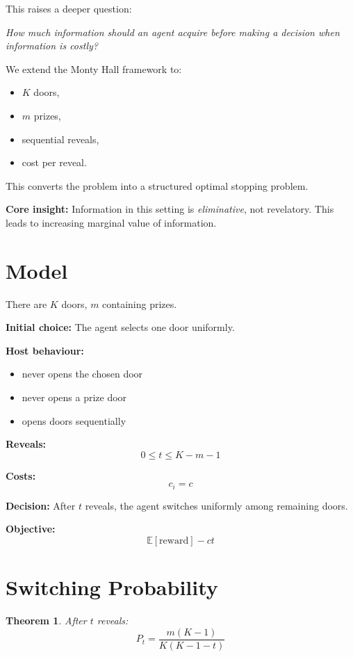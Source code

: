 \documentclass[11pt]{article}
\newtheorem{theorem}{Theorem}
\begin{document}
This raises a deeper question:

\begin{center}
\emph{How much information should an agent acquire before making a decision when information is costly?}
\end{center}

We extend the Monty Hall framework to:
\begin{itemize}
\item $K$ doors,
\item $m$ prizes,
\item sequential reveals,
\item cost per reveal.
\end{itemize}

This converts the problem into a structured optimal stopping problem.

\bigskip

\textbf{Core insight:} Information in this setting is \emph{eliminative}, not revelatory. This leads to increasing marginal value of information.

\section{Model}

There are $K$ doors, $m$ containing prizes.

\textbf{Initial choice:} The agent selects one door uniformly.

\textbf{Host behaviour:}
\begin{itemize}
\item never opens the chosen door
\item never opens a prize door
\item opens doors sequentially
\end{itemize}

\textbf{Reveals:}
\[
0 \le t \le K - m - 1
\]

\textbf{Costs:}
\[
c_i = c
\]

\textbf{Decision:}
After $t$ reveals, the agent switches uniformly among remaining doors.

\textbf{Objective:}
\[
\mathbb{E}[\text{reward}] - ct
\]

\section{Switching Probability}

\begin{theorem}
After $t$ reveals:
\[
P_t = \frac{m(K-1)}{K(K-1-t)}
\]
\end{theorem}
\end{document}
